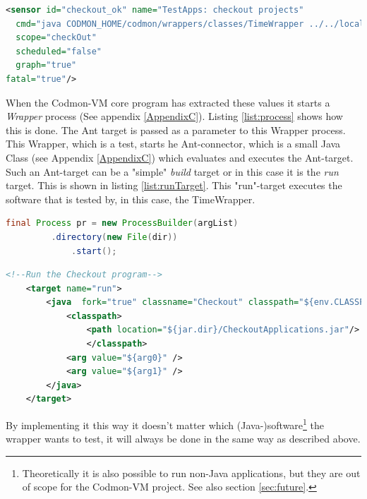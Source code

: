 \documentclass{article}
\newcommand{\project}{Codmon-VM}
\begin{document}
\begin{lstlisting}[frame=shadowbox, language=XML,showstringspaces=false]
<sensor id="checkout_ok" name="TestApps: checkout projects" 
  cmd="java CODMON_HOME/codmon/wrappers/classes/TimeWrapper ../../local/checkoutApplications ant run"  
  scope="checkOut" 
  scheduled="false" 
  graph="true" 
fatal="true"/>
\end{lstlisting} 

\noindent When the \project{} core program has extracted these values it starts a \emph{Wrapper} process (See appendix \ref{AppendixC}). Listing \ref{list:process} shows how this is done. The Ant target is 
passed as a parameter to this Wrapper process. This Wrapper, which is a test, starts he Ant-connector, which is a small Java Class (see Appendix \ref{AppendixC}) which evaluates and executes the Ant-target. 
Such an Ant-target can be a "simple" \emph{build} target or in this case it is the \emph{run} target. This is shown in listing \ref{list:runTarget}. This "run"-target executes the software that is tested by, 
in this case, the TimeWrapper.\\
 

\begin{lstlisting}[frame=shadowbox, language=Java,showstringspaces=false]
final Process pr = new ProcessBuilder(argList)
 		 .directory(new File(dir)) 
    		 .start();
\end{lstlisting} 


\begin{lstlisting}[frame=shadowbox, language=XML,showstringspaces=false]
	<!--Run the Checkout program-->
	<target name="run">
		<java  fork="true" classname="Checkout" classpath="${env.CLASSPATH}" output="out.txt">
	  		<classpath>
				<path location="${jar.dir}/CheckoutApplications.jar"/>
	        	</classpath>
			<arg value="${arg0}" />
			<arg value="${arg1}" />
		</java>
	</target>
\end{lstlisting} 

\noindent By implementing it this way it doesn't matter which (Java-)software\footnote{Theoretically it is also possible to run non-Java applications, but they are out of scope for the \project{} project. 
See also section \ref{sec:future}.} the wrapper wants to test, it will always be done in the same way as described above.
\end{document}
